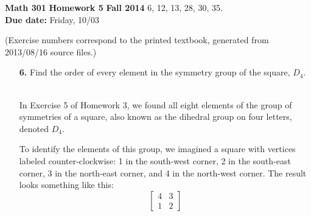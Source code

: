 \documentclass[12pt,reqno]{amsart}
\newcommand{\<}{\ensuremath{\langle}}
\renewcommand{\>}{\ensuremath{\rangle}}
\begin{document}
\thispagestyle{empty}

\noindent \textbf{Math 301} \hskip5cm {\bf Homework 5} \hfill {\bf Fall 2014}
\vskip1cm
  6, 12, 13, 28, 30, 35.\\  
{\bf Due date:} Friday, 10/03

\medskip

\noindent (Exercise numbers correspond to the printed textbook, generated from 2013/08/16 source files.)

\medskip

\begin{enumerate}

\item[{\bf 6.}]
Find the order of every element in the symmetry group of the square,
$D_4$.

\medskip 
{}\\
\noindent In Exercise 5 of Homework 3, we found all eight elements of the group
of symmetries of a square, also known as the dihedral group on four 
letters, denoted $D_4$.

To identify the elements of this group, we imagined a square with vertices labeled
counter-clockwise: 1 in the south-west corner, 2 in the south-east corner, 3 in
the north-east corner, and 4 in the north-west corner. The result looks
something like this: 
$$\begin{bmatrix} 4 & 3 \\ 1 & 2 \end{bmatrix}$$


\end{enumerate}
\end{document}
